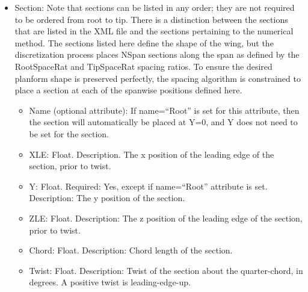 \documentclass[11pt]{article}
\begin{document}
\begin{itemize}
	\item Section: Note that sections can be listed in any order; they are not
		required to be ordered from root to tip. There is a distinction between
		the sections that are listed in the XML file and the sections pertaining
		to the numerical method. The sections listed here define the shape of
		the wing, but the discretization process places NSpan sections along the
		span as defined by the RootSpaceRat and TipSpaceRat spacing ratios. To
		ensure the desired planform shape is preserved perfectly, the spacing
		algorithm is constrained to place a section at each of the spanwise
		positions defined here.
	\begin{itemize}
		\item Name (optional attribute): If name=``Root'' is set for this
			attribute, then the section will automatically be placed at Y=0, and
			Y does not need to be set for the section.
		\item XLE: Float. Description. The x position of the
			leading edge of the section, prior to twist.
		\item Y: Float. Required: Yes, except if name=``Root'' attribute is set.
			Description: The y position of the section.
		\item ZLE: Float. Description: The z position of the
			leading edge of the section, prior to twist.
		\item Chord: Float. Description: Chord length of the
			section.
		\item Twist: Float. Description: Twist of the section
			about the quarter-chord, in degrees. A positive twist is
			leading-edge-up.
	\end{itemize}
\end{itemize}
\end{document}
